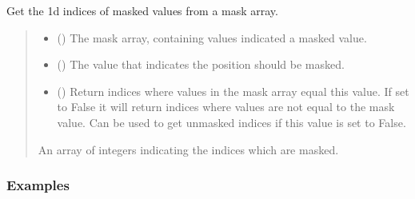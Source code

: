 \documentclass[letterpaper,10pt,english]{sphinxmanual}
\begin{document}
\begin{fulllineitems}
\label{\detokenize{misc:glomar_gridding.mask.get_mask_idx}}
\pysigstartsignatures
\pysiglinewithargsret
{}
{\sphinxparamcomma {}\sphinxparamcomma {}}
{}
\pysigstopsignatures
\sphinxAtStartPar
Get the 1d indices of masked values from a mask array.
\begin{quote}\begin{description}
\begin{itemize}
\item {}
\sphinxAtStartPar
{} () \textendash{} The mask array, containing values indicated a masked value.

\item {}
\sphinxAtStartPar
{} () \textendash{} The value that indicates the position should be masked.

\item {}
\sphinxAtStartPar
{} () \textendash{} Return indices where values in the mask array equal this value. If set
to False it will return indices where values are not equal to the mask
value. Can be used to get unmasked indices if this value is set to
False.

\end{itemize}

\sphinxAtStartPar
An array of integers indicating the indices which are masked.

\end{description}\end{quote}
\subsubsection*{Examples}

\begin{sphinxVerbatim}[commandchars=\\\{\}]
   
\PYG{p}{[}  \PYG{p}{]}  
  
\PYG{g+go}{array([[1],}
\PYG{g+go}{       [8]])}
\end{sphinxVerbatim}


\end{fulllineitems}
\end{document}
